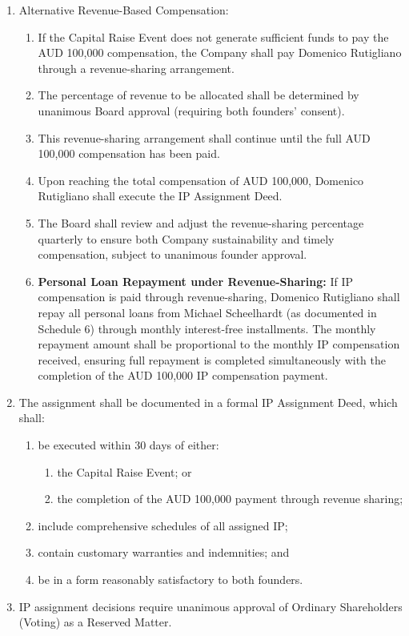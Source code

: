 \begin{enumerate}[label=(\alph*)]
\item Alternative Revenue-Based Compensation:
    \begin{enumerate}[label=(\roman*)]
    \item If the Capital Raise Event does not generate sufficient funds to pay the AUD 100,000 compensation, the Company shall pay Domenico Rutigliano through a revenue-sharing arrangement.
    \item The percentage of revenue to be allocated shall be determined by unanimous Board approval (requiring both founders' consent).
    \item This revenue-sharing arrangement shall continue until the full AUD 100,000 compensation has been paid.
    \item Upon reaching the total compensation of AUD 100,000, Domenico Rutigliano shall execute the IP Assignment Deed.
    \item The Board shall review and adjust the revenue-sharing percentage quarterly to ensure both Company sustainability and timely compensation, subject to unanimous founder approval.
    \item \textbf{Personal Loan Repayment under Revenue-Sharing:} If IP compensation is paid through revenue-sharing, Domenico Rutigliano shall repay all personal loans from Michael Scheelhardt (as documented in Schedule 6) through monthly interest-free installments. The monthly repayment amount shall be proportional to the monthly IP compensation received, ensuring full repayment is completed simultaneously with the completion of the AUD 100,000 IP compensation payment.
    \end{enumerate}

\item The assignment shall be documented in a formal IP Assignment Deed, which shall:
    \begin{enumerate}[label=(\roman*)]
    \item be executed within 30 days of either:
        \begin{enumerate}[label=(a)]
        \item the Capital Raise Event; or
        \item the completion of the AUD 100,000 payment through revenue sharing;
        \end{enumerate}
    \item include comprehensive schedules of all assigned IP;
    \item contain customary warranties and indemnities; and
    \item be in a form reasonably satisfactory to both founders.
    \end{enumerate}

\item IP assignment decisions require unanimous approval of Ordinary Shareholders (Voting) as a Reserved Matter.
\end{enumerate}

